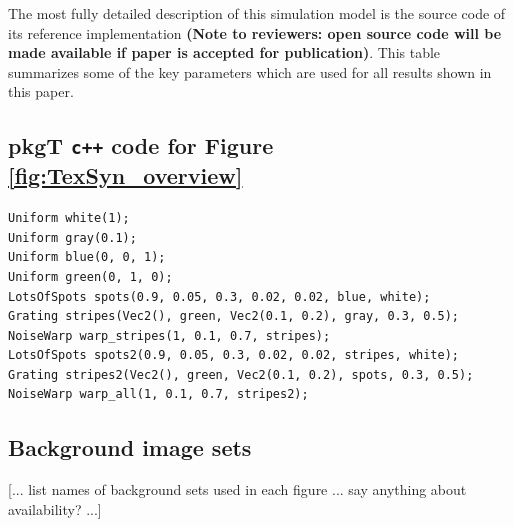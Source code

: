\documentclass[acmtog]{acmart}
\newcommand{\texsyn}[0]{pkgT}
\begin{document}
The most fully detailed description of this simulation model is the source code of its reference implementation \textbf{(Note to reviewers: open source code will be made available if paper is accepted for publication)}. This table summarizes some of the key parameters which are used for all results shown in this paper.
\par

\subsection{\texsyn{} \texttt{c++} code for Figure \ref{fig:TexSyn_overview}}
\begin{adjustwidth}{1cm}{0cm}
\begin{small}
\begin{verbatim}
Uniform white(1);
Uniform gray(0.1);
Uniform blue(0, 0, 1);
Uniform green(0, 1, 0);
LotsOfSpots spots(0.9, 0.05, 0.3, 0.02, 0.02, blue, white);
Grating stripes(Vec2(), green, Vec2(0.1, 0.2), gray, 0.3, 0.5);
NoiseWarp warp_stripes(1, 0.1, 0.7, stripes);
LotsOfSpots spots2(0.9, 0.05, 0.3, 0.02, 0.02, stripes, white);
Grating stripes2(Vec2(), green, Vec2(0.1, 0.2), spots, 0.3, 0.5);
NoiseWarp warp_all(1, 0.1, 0.7, stripes2);
\end{verbatim}
\end{small}
\end{adjustwidth}


\subsection{Background image sets}
[... list names of background sets used in each figure ... say anything about availability? ...]
\end{document}
